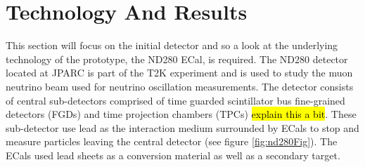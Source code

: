 \section{Technology And Results}
This section will focus on the initial detector and so a look at the underlying technology of the prototype, the ND280 ECal, is required. The ND280 detector located at JPARC is part of the T2K experiment and is used to study the muon neutrino beam used for neutrino oscillation measurements. The detector consists of central sub-detectors comprised of time guarded scintillator bus fine-grained detectors (FGDs) and time projection chambers (TPCs) \hl{explain this a bit}. These sub-detector use lead as the interaction medium surrounded by ECals to stop and measure particles leaving the central detector (see figure \ref{fig:nd280Fig}). The ECals used lead sheets as a conversion material as well as a secondary target. 

